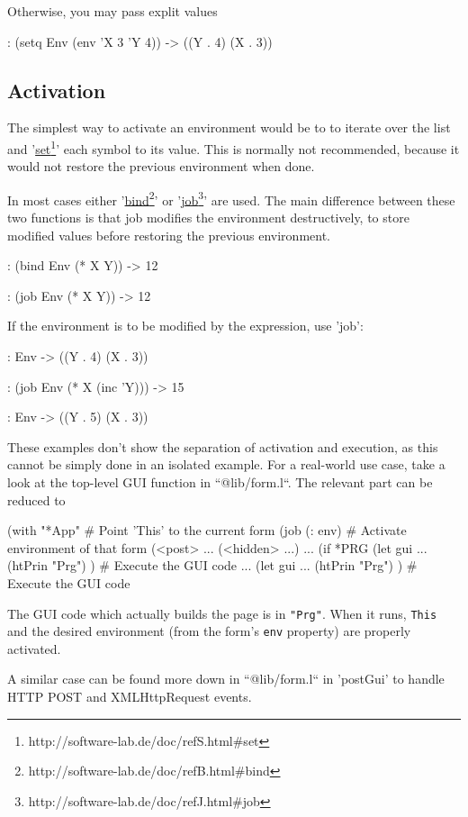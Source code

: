 Otherwise, you may pass explit values
\begin{wideverbatim}
   : (setq Env (env 'X 3 'Y 4))
   -> ((Y . 4) (X . 3))
\end{wideverbatim}


\subsection{Activation}
\label{sec:firstclass-activation}

The simplest way to activate an environment would be to to iterate over the list
and '\underline{set}\footnote{http://software-lab.de/doc/refS.html\#set}' each symbol to its value.
This is normally not recommended, because it would not restore the previous
environment when done.

In most cases either '\underline{bind}\footnote{http://software-lab.de/doc/refB.html\#bind}' or
'\underline{job}\footnote{http://software-lab.de/doc/refJ.html\#job}' are used. The main difference
between these two functions is that job modifies the environment destructively,
to store modified values before restoring the previous environment.
\begin{wideverbatim}
   : (bind Env (* X Y))
   -> 12

   : (job Env (* X Y))
   -> 12
\end{wideverbatim}

If the environment is to be modified by the expression, use 'job':
\begin{wideverbatim}
   : Env
   -> ((Y . 4) (X . 3))

   : (job Env (* X (inc 'Y)))
   -> 15

   : Env
   -> ((Y . 5) (X . 3))
\end{wideverbatim}

These examples don't show the separation of activation and execution, as this
cannot be simply done in an isolated example. For a real-world use case, take a
look at the top-level GUI function in ``@lib/form.l``. The relevant part can be
reduced to
\begin{wideverbatim}
   (with "*App"                        # Point 'This' to the current form
      (job (: env)                     # Activate environment of that form
         (<post> ...
            (<hidden> ...)
            ...
            (if *PRG
               (let gui
                  ...
                  (htPrin "Prg") )     # Execute the GUI code
               ...
               (let gui
                  ...
                  (htPrin "Prg") )     # Execute the GUI code
\end{wideverbatim}

The GUI code which actually builds the page is in \texttt{"Prg"}. When it runs,
\texttt{This} and the desired environment (from the form's \texttt{env} property) are
properly activated.

A similar case can be found more down in ``@lib/form.l`` in 'postGui' to handle
HTTP POST and XMLHttpRequest events.
